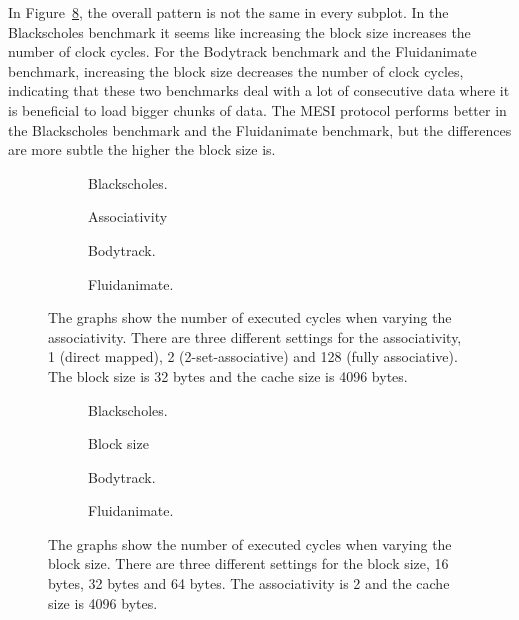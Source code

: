 In Figure~\ref{fig:block_size}, the overall pattern is not the same in every subplot.
In the Blackscholes benchmark it seems like increasing the block size increases the
number of clock cycles. For the Bodytrack benchmark and  the Fluidanimate benchmark,
increasing the block size decreases the number of clock cycles, indicating that these
two benchmarks deal with a lot of consecutive data where it is beneficial to load bigger
chunks of data. The MESI protocol performs better in the Blackscholes benchmark and the
Fluidanimate benchmark, but the differences are more subtle the higher the block size is.

\begin{figure}[H]
    \centering
    \begin{subfigure}[b]{0.33\textwidth}
        \centering
        \caption{Blackscholes.}\label{fig:associativity_blackscholes}
    \end{subfigure}%
    \hfill
    \begin{subfigure}[b]{0.33\textwidth}
        \centering
        Associativity\par\medskip
        \caption{Bodytrack.}\label{fig:associativity_bodytrack}
    \end{subfigure}%
    \hfill
    \begin{subfigure}[b]{0.33\textwidth}
        \centering
        \caption{Fluidanimate.}\label{fig:associativity_fluidanimate}
    \end{subfigure}
    \hfill
    \caption{The graphs show the number of executed cycles when varying the associativity. There are three different settings for the associativity, 1 (direct mapped), 2 (2-set-associative) and 128 (fully associative). The block size is 32 bytes and the cache size is 4096 bytes.}\label{fig:associativity}
\end{figure}

\begin{figure}[H]
    \centering
    \begin{subfigure}[b]{0.33\textwidth}
        \centering
        \caption{Blackscholes.}\label{fig:block_size_blackscholes}
    \end{subfigure}%
    \hfill
    \begin{subfigure}[b]{0.33\textwidth}
        \centering
        Block size\par\medskip
        \caption{Bodytrack.}\label{fig:block_size_bodytrack}
    \end{subfigure}%
    \hfill
    \begin{subfigure}[b]{0.33\textwidth}
        \centering
        \caption{Fluidanimate.}\label{fig:block_size_fluidanimate}
    \end{subfigure}
    \hfill
    \caption{The graphs show the number of executed cycles when varying the block size. There are three different settings for the block size, 16 bytes, 32 bytes and 64 bytes. The associativity is 2 and the cache size is 4096 bytes.}\label{fig:block_size}
\end{figure}

